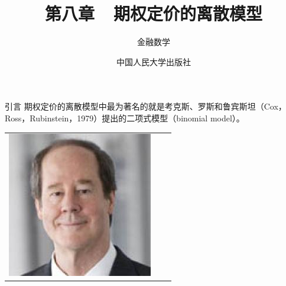 \documentclass[t]{beamer}
\begin{document}
\fontsize{11}{18}\selectfont


\CTEXindent



  \title{第八章~~期权定价的离散模型}
\author{金融数学}
\date{中国人民大学出版社}
  \begin{frame}
    \maketitle
  \end{frame}

\begin{frame}{引言}
	期权定价的离散模型中最为著名的就是考克斯、罗斯和鲁宾斯坦（Cox，Ross，Rubinstein，1979）提出的二项式模型（binomial model）。
	\begin{center}
\begin{tabular}{ccc}
\includegraphics[height=0.4\textheight]{fig/Cox.jpeg}

\end{tabular}
\end{center}
\end{frame}
\end{document}
